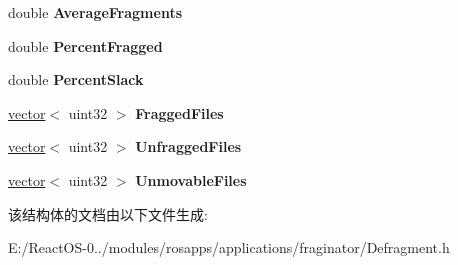 \begin{DoxyCompactItemize}
\mbox{\label{struct_defrag_report_afee55ff2576059dde58d3deb739531d3}} 
double {\bfseries Average\+Fragments}
\item 
\mbox{\label{struct_defrag_report_a3ff6e85b321cfd4d92089dfd0460d704}} 
double {\bfseries Percent\+Fragged}
\item 
\mbox{\label{struct_defrag_report_a354db682df957c76108f0038ec7c82f8}} 
double {\bfseries Percent\+Slack}
\item 
\mbox{\label{struct_defrag_report_a416cd868da982fea2347887c4ef1d48e}} 
\hyperlink{structvector}{vector}$<$ uint32 $>$ {\bfseries Fragged\+Files}
\item 
\mbox{\label{struct_defrag_report_a3fa23bffb2f8a89d4c307067d2b220a5}} 
\hyperlink{structvector}{vector}$<$ uint32 $>$ {\bfseries Unfragged\+Files}
\item 
\mbox{\label{struct_defrag_report_a2f44dfa7af2585042092497eb153d22a}} 
\hyperlink{structvector}{vector}$<$ uint32 $>$ {\bfseries Unmovable\+Files}
\end{DoxyCompactItemize}


该结构体的文档由以下文件生成\+:\begin{DoxyCompactItemize}
\item 
E\+:/\+React\+O\+S-\/0../modules/rosapps/applications/fraginator/Defragment.\+h\end{DoxyCompactItemize}
